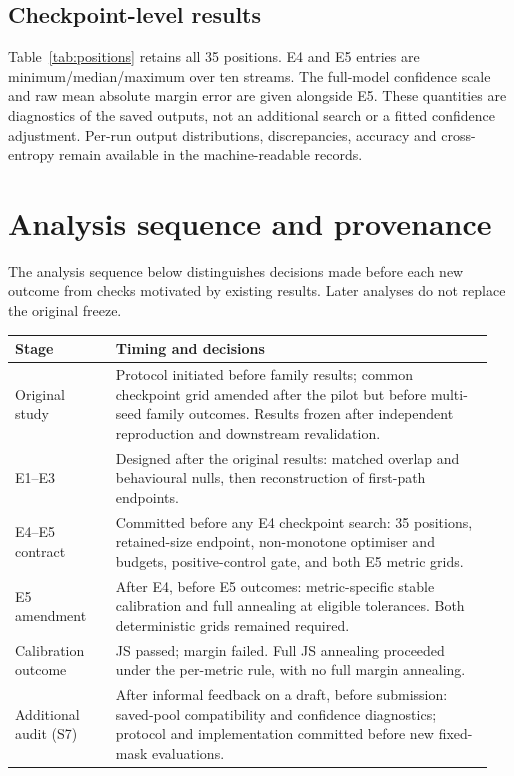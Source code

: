 \documentclass[10pt]{article}
\begin{document}


\subsection{Checkpoint-level results}
Table~\ref{tab:positions} retains all 35 positions. E4 and E5 entries are minimum/median/maximum over ten streams. The full-model confidence scale and raw mean absolute margin error are given alongside E5. These quantities are diagnostics of the saved outputs, not an additional search or a fitted confidence adjustment. Per-run output distributions, discrepancies, accuracy and cross-entropy remain available in the machine-readable records.


\section{Analysis sequence and provenance}
The analysis sequence below distinguishes decisions made before each new outcome from checks motivated by existing results. Later analyses do not replace the original freeze.
\begin{center}\small
\begin{tabular}{@{}p{0.20\linewidth}p{0.75\linewidth}@{}}
\toprule
Stage & Timing and decisions\\\midrule
Original study & Protocol initiated before family results; common checkpoint grid amended after the pilot but before multi-seed family outcomes. Results frozen after independent reproduction and downstream revalidation.\\[5pt]
E1--E3 & Designed after the original results: matched overlap and behavioural nulls, then reconstruction of first-path endpoints.\\[5pt]
E4--E5 contract & Committed before any E4 checkpoint search: 35 positions, retained-size endpoint, non-monotone optimiser and budgets, positive-control gate, and both E5 metric grids.\\[5pt]
E5 amendment & After E4, before E5 outcomes: metric-specific stable calibration and full annealing at eligible tolerances. Both deterministic grids remained required.\\[5pt]
Calibration outcome & JS passed; margin failed. Full JS annealing proceeded under the per-metric rule, with no full margin annealing.\\[5pt]
Additional audit (S7) & After informal feedback on a draft, before submission: saved-pool compatibility and confidence diagnostics; protocol and implementation committed before new fixed-mask evaluations.\\
\bottomrule
\end{tabular}
\end{center}
\end{document}

